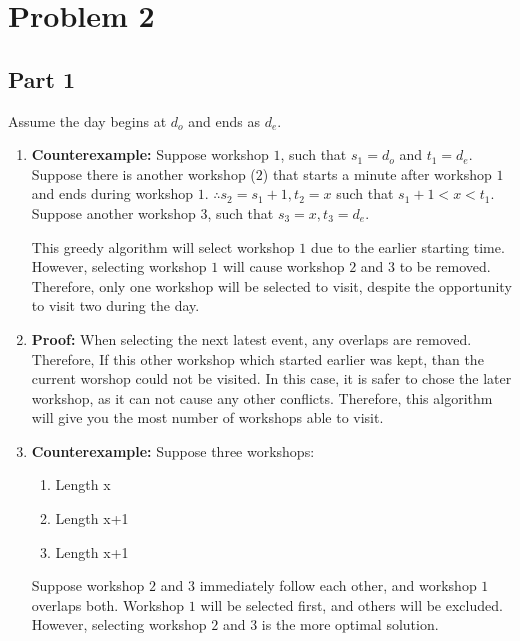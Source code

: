 \documentclass{article}
\begin{document}
\section{Problem 2}

\subsection{Part 1}

Assume the day begins at $d_o$ and ends as $d_e$.

\begin{enumerate}[label=(\alph*)]
    \item \textbf{Counterexample:} Suppose workshop $1$, such that $s_1 = d_o$
    and $t_1 = d_e$. Suppose there is another workshop ($2$) that starts a minute
    after workshop $1$ and ends during workshop $1$. $\therefore s_2=s_1 + 1, t_2=x$
    such that $s_1+1 < x < t_1$. Suppose another workshop $3$, such that 
    $s_3 = x, t_3 = d_e$.

    This greedy algorithm will select workshop $1$ due to the earlier starting time.
    However, selecting workshop $1$ will cause workshop $2$ and $3$ to be removed.
    Therefore, only one workshop will be selected to visit,
    despite the opportunity to visit two during the day.

    \item \textbf{Proof:} When selecting the next latest event, any overlaps are removed.
    Therefore, If this other workshop which started earlier was kept, than the current
    worshop could not be visited. In this case, it is safer to chose the later workshop,
    as it can not cause any other conflicts. Therefore, this algorithm will give you the
    most number of workshops able to visit.

    \item \textbf{Counterexample:} Suppose three workshops:
        \begin{enumerate}[label=\arabic*]
            \item Length x
            \item Length x+1
            \item Length x+1
        \end{enumerate}

        Suppose workshop $2$ and $3$ immediately follow each other, and workshop $1$ overlaps both.
        Workshop $1$ will be selected first, and others will be excluded.
        However, selecting workshop $2$ and $3$ is the more optimal solution.
\end{enumerate}
\end{document}

